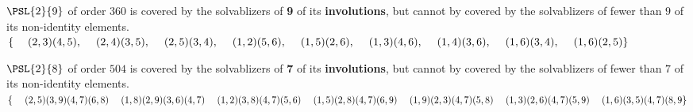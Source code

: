 \documentclass[12pt]{amsart}
\begin{document}
$\PSL{2}{9}$ of order $360$ is covered by the solvablizers of \textbf{9} of its
\textbf{involutions}, but cannot by covered by the solvablizers of fewer
than $9$ of its non-identity elements. \\
{ \tiny $\{ \\
\phantom. \quad (2,3)(4,5), \\
\phantom. \quad (2,4)(3,5), \\
\phantom. \quad (2,5)(3,4), \\
\phantom. \quad (1,2)(5,6), \\
\phantom. \quad (1,5)(2,6), \\
\phantom. \quad (1,3)(4,6), \\
\phantom. \quad (1,4)(3,6), \\
\phantom. \quad (1,6)(3,4), \\
\phantom. \quad (1,6)(2,5) \\
\}$ }

$\PSL{2}{8}$ of order $504$ is covered by the solvablizers of \textbf{7}
of its \textbf{involutions}, but cannot by covered by the solvablizers of fewer
than $7$ of its non-identity elements. \\
{\tiny $\{
\phantom. \quad (2,5)(3,9)(4,7)(6,8) \\
\phantom. \quad (1,8)(2,9)(3,6)(4,7) \\
\phantom. \quad (1,2)(3,8)(4,7)(5,6) \\
\phantom. \quad (1,5)(2,8)(4,7)(6,9) \\
\phantom. \quad (1,9)(2,3)(4,7)(5,8) \\
\phantom. \quad (1,3)(2,6)(4,7)(5,9) \\
\phantom. \quad (1,6)(3,5)(4,7)(8,9 \\
\}$ }
\end{document}
